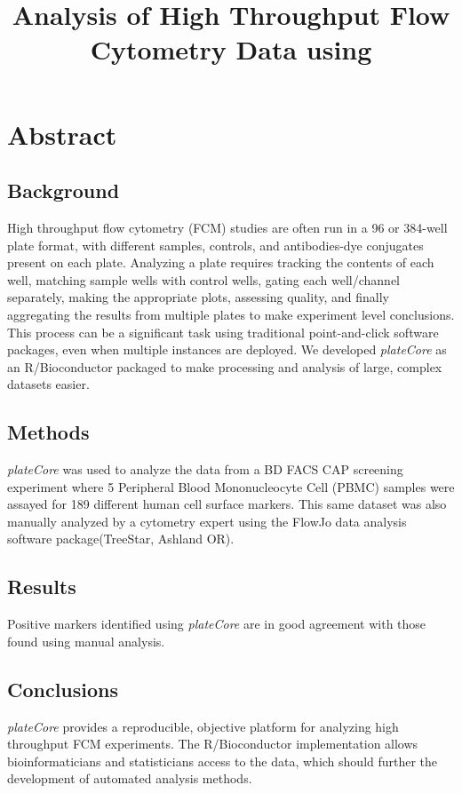 \documentclass[12pt]{article}
\title{Analysis of High Throughput Flow Cytometry Data using \Rpackage{plateCore}}
\newcommand{\Rpackage}[1]{{\textit{#1}}}
\begin{document}
\maketitle

\clearpage
\section*{Abstract}
\subsection*{Background}
High throughput flow cytometry (FCM) studies are often run in a 96 or 384-well plate format, with different samples, 
controls, and antibodies-dye conjugates present on each plate. 
Analyzing a plate requires tracking the contents
of each well, matching sample wells with control wells, gating each well/channel separately, making the appropriate plots,
assessing quality, and finally aggregating the results from multiple plates to make experiment level conclusions.
This process can be a significant task using traditional point-and-click software packages, even when multiple instances are
deployed. We developed \Rpackage{plateCore} as an R/Bioconductor packaged to make processing and analysis of
large, complex datasets easier. 

\subsection*{Methods}
\Rpackage{plateCore} was used to analyze the data from a BD FACS CAP screening experiment where 5
Peripheral Blood Mononucleocyte Cell (PBMC) samples 
were assayed for 189 different human cell surface markers. 
This same dataset was also manually analyzed by a cytometry expert using the FlowJo data analysis software package(TreeStar, Ashland OR).

\subsection*{Results}
Positive markers identified using \Rpackage{plateCore} are in good agreement with those found using manual analysis.

\subsection*{Conclusions}
\Rpackage{plateCore} provides a reproducible, objective platform for analyzing high throughput FCM experiments. The R/Bioconductor 
implementation allows bioinformaticians and statisticians access to the data, which should further the development of automated
analysis methods.
\end{document}
